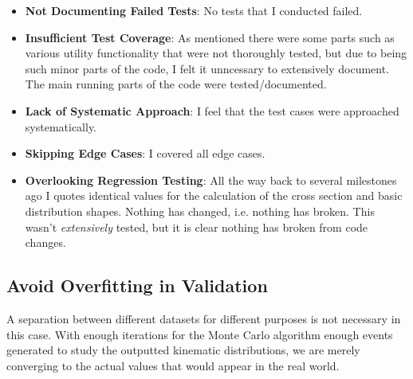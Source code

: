 \begin{itemize}
\item \textbf{Not Documenting Failed Tests}: No tests that I conducted failed.
\item \textbf{Insufficient Test Coverage}: As mentioned there were some parts such as various utility functionality that were not thoroughly tested, but due to being such minor parts of the code, I felt it unncessary to extensively document. The main running parts of the code were tested/documented.
\item \textbf{Lack of Systematic Approach}: I feel that the test cases were approached systematically.
\item \textbf{Skipping Edge Cases}: I covered all edge cases.
\item \textbf{Overlooking Regression Testing}: All the way back to several milestones ago I quotes identical values for the calculation of the cross section and basic distribution shapes. Nothing has changed, i.e. nothing has broken. This wasn't \textit{extensively} tested, but it is clear nothing has broken from code changes.
\end{itemize}

\subsection{Avoid Overfitting in Validation}

A separation between different datasets for different purposes is not necessary in this case. With enough iterations for the Monte Carlo algorithm enough events generated to study the outputted kinematic distributions, we are merely converging to the actual values that would appear in the real world.
